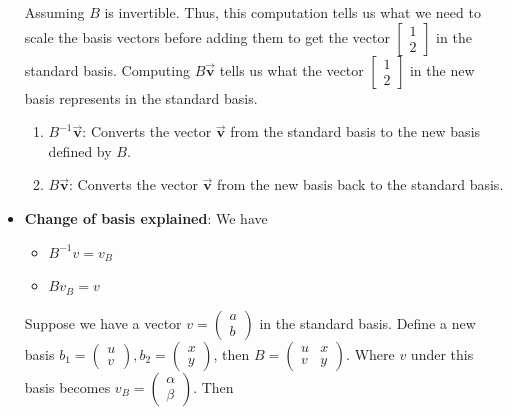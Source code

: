 \documentclass{report}
\begin{document}
\begin{itemize}
            \bigbreak \noindent 
            Assuming $B$ is invertible. Thus, this computation tells us what we need to scale the basis vectors before adding them to get the vector $\begin{bmatrix} 1 \\ 2\end{bmatrix}$ in the standard basis.
            \bigbreak \noindent 
            Computing $B\vec{\mathbf{v}}$ tells us what the vector $\begin{bmatrix} 1\\2 \end{bmatrix} $ in the new basis represents in the standard basis.
            \bigbreak \noindent 
            \begin{enumerate}
                \item $B^{-1}\vec{\mathbf{v}}$: Converts the vector $\vec{\mathbf{v}}$ from the standard basis to the new basis defined by $B$.
                \item $B\vec{\mathbf{v}}$: Converts the vector $\vec{\mathbf{v}}$ from the new basis back to the standard basis.
            \end{enumerate}
        \item \textbf{Change of basis explained}: We have
            \begin{itemize}
                \item $B^{-1}v = v_{B}$
                \item $Bv_{B} = v$
            \end{itemize}
            \bigbreak \noindent 
            Suppose we have a vector $v = \begin{pmatrix} a \\ b \end{pmatrix}$ in the standard basis. Define a new basis $b_{1} = \begin{pmatrix} u \\ v \end{pmatrix}, b_{2} = \begin{pmatrix} x \\ y\end{pmatrix}$, then $B = \begin{pmatrix} u & x \\ v & y\end{pmatrix} $. Where $v$ under this basis becomes $v_{B} = \begin{pmatrix} \alpha \\ \beta\end{pmatrix} $. Then
            \begin{align*}

\end{align*}
\end{itemize}
\end{document}
